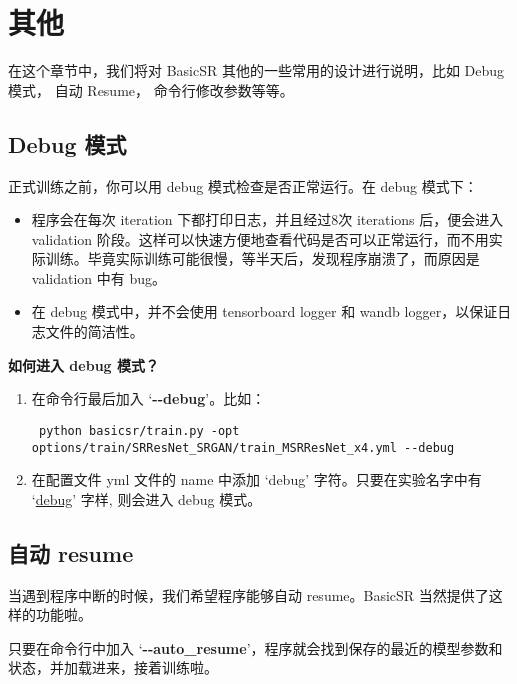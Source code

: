 \documentclass[../main.tex]{subfiles}
\begin{document}
\chapter{其他}
\vspace{-2cm}

在这个章节中，我们将对 BasicSR 其他的一些常用的设计进行说明，比如 Debug 模式， 自动 Resume， 命令行修改参数等等。

\section{Debug 模式}\label{others:debug_mode}

正式训练之前，你可以用 debug 模式检查是否正常运行。在 debug 模式下：
\begin{itemize}
	\item 程序会在每次 iteration 下都打印日志，并且经过8次 iterations 后，便会进入 validation 阶段。这样可以快速方便地查看代码是否可以正常运行，而不用实际训练。毕竟实际训练可能很慢，等半天后，发现程序崩溃了，而原因是 validation 中有 bug。
	\item 在 debug 模式中，并不会使用 tensorboard logger 和 wandb logger，以保证日志文件的简洁性。
\end{itemize}

\textbf{如何进入 debug 模式？}

\begin{enumerate}[方式 1.]
	\item 在命令行最后加入 ‘\textbf{-{}-debug}’。比如：
	\begin{verbatim}
 python basicsr/train.py -opt options/train/SRResNet_SRGAN/train_MSRResNet_x4.yml --debug
	\end{verbatim}
	\item 在配置文件 yml 文件的 name 中添加 ‘debug’ 字符。只要在实验名字中有 ‘\uline{debug}’ 字样, 则会进入 debug 模式。
\end{enumerate}

\section{自动 resume}\label{others:auto_resume}

当遇到程序中断的时候，我们希望程序能够自动 resume。BasicSR 当然提供了这样的功能啦。

只要在命令行中加入 ‘\textbf{-{}-auto\_resume}’，程序就会找到保存的最近的模型参数和状态，并加载进来，接着训练啦。
\end{document}
